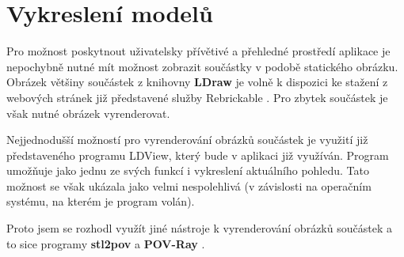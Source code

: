 \section{Vykreslení modelů}
Pro možnost poskytnout uživatelsky přívětivé a přehledné prostředí aplikace je nepochybně nutné mít možnost zobrazit součástky v podobě statického obrázku. Obrázek většiny součástek z knihovny \textbf{LDraw} je volně k dispozici ke stažení z webových stránek již představené služby Rebrickable \autocite{rebrickable:download}. Pro zbytek součástek je však nutné obrázek vyrenderovat. 

Nejjednodušší možností pro vyrenderování obrázků součástek je využití již představeného programu LDView, který bude v aplikaci již využíván. Program umožňuje jako jednu ze svých funkcí i vykreslení aktuálního pohledu. Tato možnost se však ukázala jako velmi nespolehlivá (v závislosti na operačním systému, na kterém je program volán).

Proto jsem se rozhodl využít jiné nástroje k vyrenderování obrázků součástek a to sice programy \textbf{stl2pov} \autocite{stl2pov} a \textbf{POV-Ray} \autocite{povray}.

